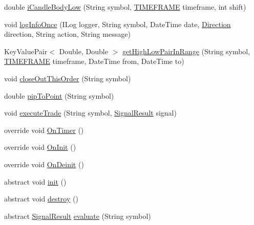 \begin{DoxyCompactItemize}
\item 
double \hyperlink{class_m_q_l4_c_sharp_1_1_base_1_1_base_strategy_ac0a227fa222038dc953246b17b9dbc65}{i\+Candle\+Body\+Low} (String symbol, \hyperlink{namespace_m_q_l4_c_sharp_1_1_base_1_1_enums_a838810aaa87c63c12737408dba8c0b35}{T\+I\+M\+E\+F\+R\+A\+ME} timeframe, int shift)
\item 
void \hyperlink{class_m_q_l4_c_sharp_1_1_base_1_1_base_strategy_ab4d95f5d8cdab06dc8bf2023675e429f}{log\+Info\+Once} (I\+Log logger, String symbol, Date\+Time date, \hyperlink{namespace_m_q_l4_c_sharp_1_1_base_1_1_enums_a8bd45b58389fa72ba1d4e8a192f17510}{Direction} direction, String action, String message)
\item 
Key\+Value\+Pair$<$ Double, Double $>$ \hyperlink{class_m_q_l4_c_sharp_1_1_base_1_1_base_strategy_ac9c57da9e1d147cbdef1547e48eb91fe}{get\+High\+Low\+Pair\+In\+Range} (String symbol, \hyperlink{namespace_m_q_l4_c_sharp_1_1_base_1_1_enums_a838810aaa87c63c12737408dba8c0b35}{T\+I\+M\+E\+F\+R\+A\+ME} timeframe, Date\+Time from, Date\+Time to)
\item 
void \hyperlink{class_m_q_l4_c_sharp_1_1_base_1_1_base_strategy_a644f5454de00a7ba3f600c6eb0ed5739}{close\+Out\+This\+Order} (String symbol)
\item 
double \hyperlink{class_m_q_l4_c_sharp_1_1_base_1_1_base_strategy_a19f006fb25ac295b50bca5ef014b276d}{pip\+To\+Point} (String symbol)
\item 
void \hyperlink{class_m_q_l4_c_sharp_1_1_base_1_1_base_strategy_aac94c29f727bfcf220886d078cb8e60f}{execute\+Trade} (String symbol, \hyperlink{class_m_q_l4_c_sharp_1_1_base_1_1_common_1_1_signal_result}{Signal\+Result} signal)
\item 
override void \hyperlink{class_m_q_l4_c_sharp_1_1_base_1_1_base_strategy_a45bd0bb490031efc31e17eda1a8be6ed}{On\+Timer} ()
\item 
override void \hyperlink{class_m_q_l4_c_sharp_1_1_base_1_1_base_strategy_a91aad10a8f6039ab88fc8c1a74ad5508}{On\+Init} ()
\item 
override void \hyperlink{class_m_q_l4_c_sharp_1_1_base_1_1_base_strategy_ac18e3ca1d229a830d44acde9da60e730}{On\+Deinit} ()
\item 
abstract void \hyperlink{class_m_q_l4_c_sharp_1_1_base_1_1_base_strategy_aa2311f1094250b8282bb4de4ffd0a737}{init} ()
\item 
abstract void \hyperlink{class_m_q_l4_c_sharp_1_1_base_1_1_base_strategy_a9ab6a2f7e5af2ce3c15664f7b23fbc65}{destroy} ()
\item 
abstract \hyperlink{class_m_q_l4_c_sharp_1_1_base_1_1_common_1_1_signal_result}{Signal\+Result} \hyperlink{class_m_q_l4_c_sharp_1_1_base_1_1_base_strategy_af1ae8df8ec0ddcfe3591bd0732292fa8}{evaluate} (String symbol)

\end{DoxyCompactItemize}
